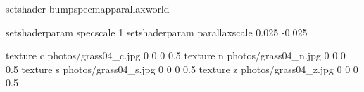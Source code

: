 setshader bumpspecmapparallaxworld

setshaderparam specscale 1
setshaderparam parallaxscale 0.025 -0.025

texture c photos/grass04_c.jpg 0 0 0 0.5
texture n photos/grass04_n.jpg 0 0 0 0.5
texture s photos/grass04_s.jpg 0 0 0 0.5
texture z photos/grass04_z.jpg 0 0 0 0.5
